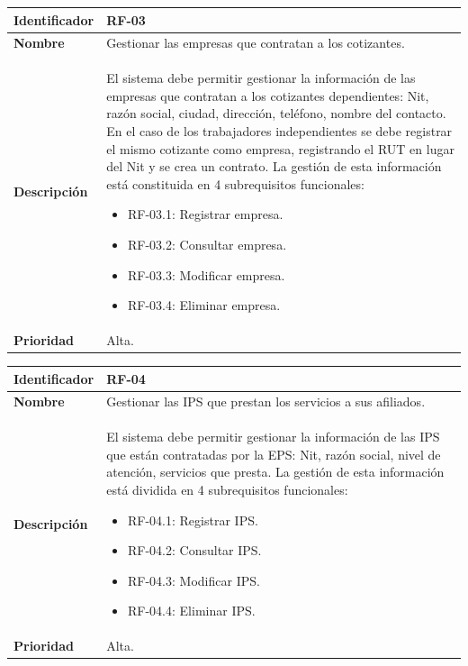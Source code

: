 \documentclass[12pt,a4paper]{article}
\begin{document}
\begin{center}
\begin{tabular}{|m{5.5cm}|m{9.5cm}|}
\hline
\textbf{Identificador} & RF-03\\
\hline
\textbf{Nombre} & Gestionar las empresas que contratan a los cotizantes.\\
\hline
\textbf{Descripción} & El sistema debe permitir gestionar la información de las empresas que contratan a los cotizantes dependientes: Nit, razón social, ciudad, dirección, teléfono, nombre del contacto. En el caso de los trabajadores independientes se debe registrar el mismo cotizante como empresa, registrando el RUT en lugar del Nit y se crea un contrato. La gestión de esta información está constituida en 4 subrequisitos funcionales:
\begin{itemize}
\item RF-03.1: Registrar empresa.
\item RF-03.2: Consultar empresa.
\item RF-03.3: Modificar empresa.
\item RF-03.4: Eliminar empresa.
\end{itemize}\\
\hline
\textbf{Prioridad} & Alta.\\
\hline
\end{tabular}
\vspace{5mm}

\begin{tabular}{|m{5.5cm}|m{9.5cm}|}
\hline
\textbf{Identificador} & RF-04\\
\hline
\textbf{Nombre} & Gestionar las IPS que prestan los servicios a sus afiliados.\\
\hline
\textbf{Descripción} & El sistema debe permitir gestionar la información de las IPS que están contratadas por la EPS: Nit, razón social, nivel de atención, servicios que presta. La gestión de esta información está dividida en 4 subrequisitos funcionales:
\begin{itemize}
\item RF-04.1: Registrar IPS.
\item RF-04.2: Consultar IPS.
\item RF-04.3: Modificar IPS.
\item RF-04.4: Eliminar IPS.
\end{itemize}\\
\hline
\textbf{Prioridad} & Alta.\\
\hline
\end{tabular}
\vspace{5mm}


\end{center}
\end{document}

